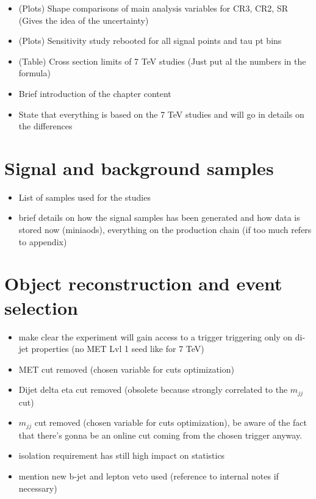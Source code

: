 
\begin{itemize}
	\item (Plots) Shape comparisons of main analysis variables for CR3, CR2, SR (Gives the idea of the uncertainty)
	\item (Plots) Sensitivity study rebooted for all signal points and tau pt bins
	\item (Table) Cross section limits of 7 TeV studies (Just put al the numbers in the formula)
\end{itemize}


\begin{itemize}
	\item Brief introduction of the chapter content
	\item State that everything is based on the 7 TeV studies and will go in details on the differences
\end{itemize}


\section{Signal and background samples}

\begin{itemize}
	\item List of samples used for the studies
	\item brief details on how the signal samples has been generated and how data is stored now (miniaods), everything on the production chain (if too much refers to appendix)
\end{itemize}



\section{Object reconstruction and event selection}
\begin{itemize}
	\item make clear the experiment will gain access to a trigger triggering only on di-jet properties (no MET Lvl 1 seed like for 7 TeV)
	\item MET cut removed (chosen variable for cuts optimization)
	\item Dijet delta eta cut removed (obsolete because strongly correlated to the $m_{jj}$ cut) 
	\item $m_{jj}$ cut removed (chosen variable for cuts optimization), be aware of the fact that there's gonna be an online cut coming from the chosen trigger anyway.
	\item \hadtau isolation requirement has still high impact on statistics
	\item mention new b-jet and lepton veto used (reference to internal notes if necessary)
\end{itemize}

